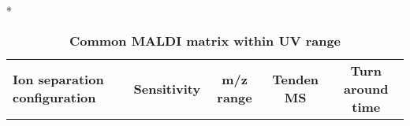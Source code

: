 \begin{table}{*}
\caption{\textbf{Common MALDI matrix within UV range}}
\label{tab:matrix}

\centering 
\scriptsize

\begin{tabular}{|l|c|c|c|c|}
    \hline 
    \textbf{Ion separation configuration} & \textbf{Sensitivity} & \textbf{m/z range} & \textbf{Tenden MS} & \textbf{Turn around time} \\
\end{tabular}
\end{table}